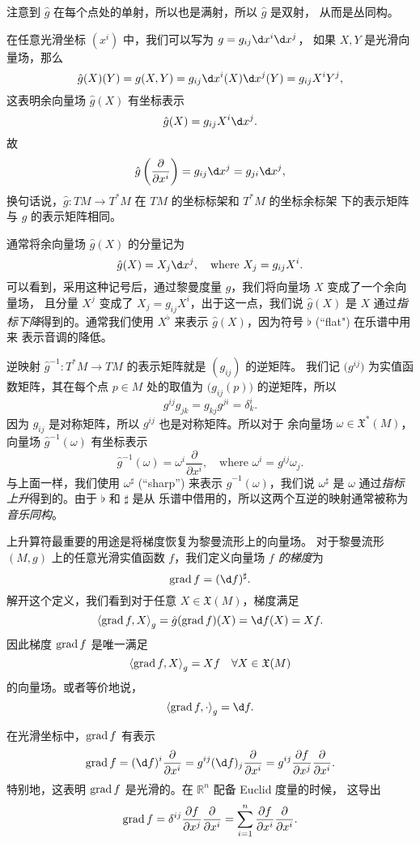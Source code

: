 注意到 $\hat g$ 在每个点处的单射，所以也是满射，所以 $\hat g$ 是双射，
从而是丛同构。

在任意光滑坐标 $(x^i)$ 中，我们可以写为 $g=g_{ij}\d x^i\d x^j$，
如果 $X,Y$ 是光滑向量场，那么
\[
  \hat g(X)(Y)=g(X,Y)=g_{ij}\d x^i(X)\d x^j(Y)=
  g_{ij}X^iY^j,  
\]
这表明余向量场 $\hat g(X)$ 有坐标表示
\[
  \hat g(X)=g_{ij}X^i\d x^j.  
\]
故
\[
  \hat g\left(\frac{\partial}{\partial x^i}\right)=
  g_{ij} \d x^j=g_{ji}\d x^j,  
\]
换句话说，$\hat g:TM\to T^*M$ 在 $TM$ 的坐标标架和 $T^*M$ 的坐标余标架
下的表示矩阵与 $g$ 的表示矩阵相同。

通常将余向量场 $\hat g(X)$ 的分量记为
\[
  \hat g(X)=X_j\d x^j,\quad \text{where $X_j=g_{ij}X^i$}.  
\]
可以看到，采用这种记号后，通过黎曼度量 $g$，我们将向量场 $X$ 变成了一个余向量场，
且分量 $X^j$ 变成了 $X_j=g_{ij}X^i$，出于这一点，我们说
$\hat g(X)$ 是 $X$ 通过\emph{指标下降}得到的。通常我们使用 
$X^\flat$ 来表示 $\hat g(X)$，因为符号 $\flat$ (``flat") 在乐谱中用来
表示音调的降低。

逆映射 $\hat g^{-1}:T^*M\to TM$ 的表示矩阵就是 $(g_{ij})$ 的逆矩阵。
我们记 $\bigl(g^{ij}\bigr)$ 为实值函数矩阵，其在每个点 $p\in M$
处的取值为 $\bigl(g_{ij}(p)\bigr)$ 的逆矩阵，所以
\[
  g^{ij}g_{jk}=g_{kj}g^{ji}=\delta_k^i.  
\]
因为 $g_{ij}$ 是对称矩阵，所以 $g^{ij}$ 也是对称矩阵。所以对于
余向量场 $\omega\in \mathfrak{X}^*(M)$，向量场 $\hat g^{-1}(\omega)$
有坐标表示
\[
  \hat g^{-1}(\omega)=\omega^i\frac{\partial}{\partial x^i},
  \quad \text{where $\omega^i=g^{ij}\omega_j$}  .
\]
与上面一样，我们使用 $\omega^{\sharp}$ (``sharp'') 来表示
$\hat g^{-1}(\omega)$，我们说 $\omega^\sharp$ 是 $\omega$
通过\emph{指标上升}得到的。由于 $\flat$ 和 $\sharp$ 是从
乐谱中借用的，所以这两个互逆的映射通常被称为\emph{音乐同构}。

上升算符最重要的用途是将梯度恢复为黎曼流形上的向量场。
对于黎曼流形 $(M,g)$ 上的任意光滑实值函数 $f$，我们定义向量场
\emph{$f$ 的梯度}为
\[
  \grad f=(\d f)^\sharp.
\]
解开这个定义，我们看到对于任意 $X\in \mathfrak{X}(M)$，梯度满足
\[
  \inn{\grad f,X}_g=\hat g(\grad f)(X)=
  \d f(X)=Xf.
\]
因此梯度 $\operatorname{grad} f$ 是唯一满足
\[
  \left\langle \operatorname{grad} f,X\right\rangle_g=Xf\quad \forall X\in \mathfrak{X}(M)  
\]
的向量场。或者等价地说，
\[
  \inn{\grad f,\cdot}_g=\d f.  
\]

在光滑坐标中，$\operatorname{grad} f$ 有表示
\[
  \grad f=(\d f)^i\frac{\partial}{\partial x^i}
  =g^{ij}(\d f)_j  \frac{\partial}{\partial x^i}
  =g^{ij}\frac{\partial f}{\partial x^j}\frac{\partial}{\partial x^i}.
\]
特别地，这表明 $\operatorname{grad} f$ 是光滑的。在 $\mathbb{R}^n$ 配备 Euclid 度量的时候，
这导出
\[
  \operatorname{grad} f=\delta^{ij}\frac{\partial f}{\partial x^j}\frac{\partial}{\partial x^i}
  =\sum_{i=1}^n\frac{\partial f}{\partial x^i}\frac{\partial}{\partial x^i}.
\]

